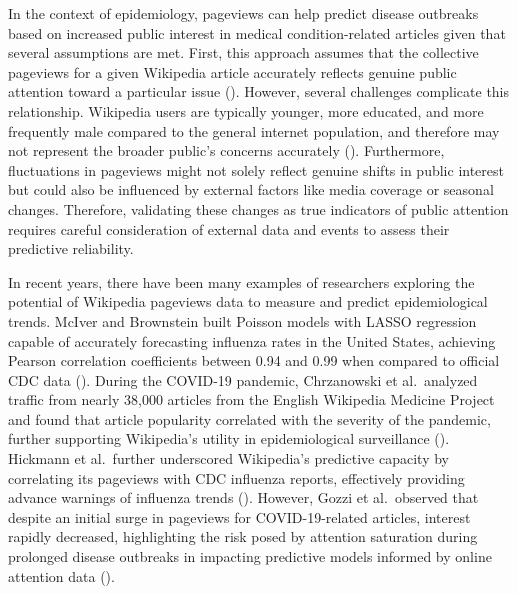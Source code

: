 \documentclass[
  12pt,
]{article}
\begin{document}
In the context of epidemiology, pageviews can help predict disease
outbreaks based on increased public interest in medical
condition-related articles given that several assumptions are met.
First, this approach assumes that the collective pageviews for a given
Wikipedia article accurately reflects genuine public attention toward a
particular issue (). However,
several challenges complicate this relationship. Wikipedia users are
typically younger, more educated, and more frequently male compared to
the general internet population, and therefore may not represent the
broader public's concerns accurately (). Furthermore, fluctuations in pageviews might not solely
reflect genuine shifts in public interest but could also be influenced
by external factors like media coverage or seasonal changes. Therefore,
validating these changes as true indicators of public attention requires
careful consideration of external data and events to assess their
predictive reliability.

In recent years, there have been many examples of researchers exploring
the potential of Wikipedia pageviews data to measure and predict
epidemiological trends. McIver and Brownstein built Poisson models with
LASSO regression capable of accurately forecasting influenza rates in
the United States, achieving Pearson correlation coefficients between
0.94 and 0.99 when compared to official CDC data
().
During the COVID-19 pandemic, Chrzanowski et al.~analyzed traffic from
nearly 38,000 articles from the English Wikipedia Medicine Project and
found that article popularity correlated with the severity of the
pandemic, further supporting Wikipedia's utility in epidemiological
surveillance ().
Hickmann et al.~further underscored Wikipedia's predictive capacity by
correlating its pageviews with CDC influenza reports, effectively
providing advance warnings of influenza trends
(). However, Gozzi et
al.~observed that despite an initial surge in pageviews for
COVID-19-related articles, interest rapidly decreased, highlighting the
risk posed by attention saturation during prolonged disease outbreaks in
impacting predictive models informed by online attention data
().
\end{document}
